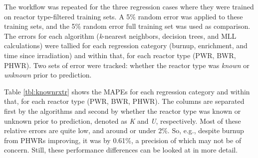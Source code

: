 The workflow was repeated for the three regression cases where they were
trained on reactor type-filtered training sets. A 5\% random error was applied
to these training sets, and the 5\% random error full training set was used as
comparison. The errors for each algorithm (\textit{k}-nearest neighbors,
decision trees, and \gls{MLL} calculations) were tallied for each regression
category (burnup, enrichment, and time since irradiation) and within that, for
each reactor type (\gls{PWR}, \gls{BWR}, \gls{PHWR}). Two sets of error were
tracked: whether the reactor type was \textit{known} or \textit{unknown} prior
to prediction.

Table \ref{tbl:knownrxtr} shows the \gls{MAPE}s for each regression category
and within that, for each reactor type (\gls{PWR}, \gls{BWR}, \gls{PHWR}).  The
columns are separated first by the algorithms and second by whether the reactor
type was known or unknown prior to prediction, denoted as \textit{K} and
\textit{U}, respectively. Most of these relative errors are quite low, and
around or under 2\%.  So, e.g., despite burnup from \gls{PHWR}s improving, it
was by 0.61\%, a precision of which may not be of concern. Still, these
performance differences can be looked at in more detail.  

